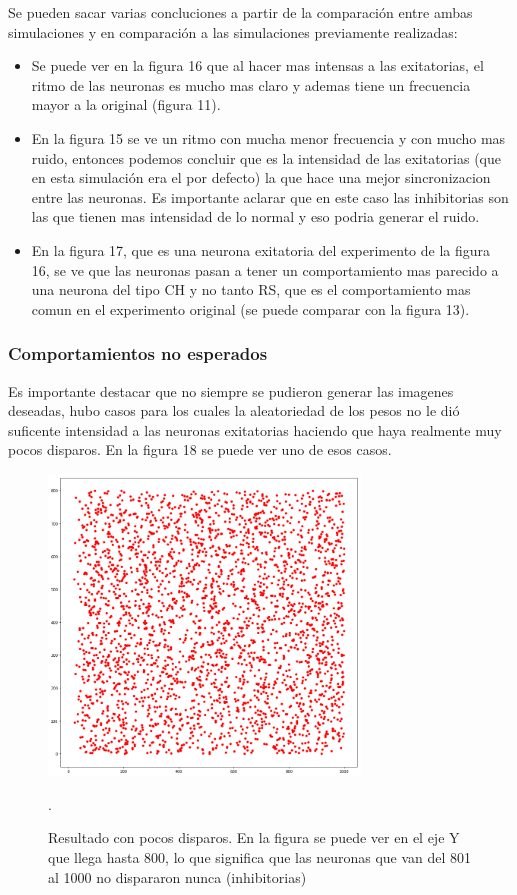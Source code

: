 \documentclass[12pt]{article}
\begin{document}
Se pueden sacar varias concluciones a partir de la comparación entre ambas simulaciones y en comparación a las simulaciones previamente realizadas:
\begin{itemize}
    \item Se puede ver en la figura 16 que al hacer mas intensas a las exitatorias, el ritmo de las neuronas es mucho mas claro y ademas tiene un frecuencia mayor a la original (figura 11).
    \item En la figura 15 se ve un ritmo con mucha menor frecuencia y con mucho mas ruido, entonces podemos concluir que es la intensidad de las exitatorias (que en esta simulación era el por defecto)
    la que hace una mejor sincronizacion entre las neuronas. Es importante aclarar que en este caso las inhibitorias son las que tienen mas intensidad de lo normal y eso podria generar el ruido.
    \item En la figura 17, que es una neurona exitatoria del experimento de la figura 16, se ve que las neuronas pasan a tener un comportamiento mas parecido a una neurona del tipo CH y no tanto RS, que es el comportamiento mas comun en el experimento original (se puede comparar con la figura 13).
\end{itemize}

\subsubsection{Comportamientos no esperados}
Es importante destacar que no siempre se pudieron generar las imagenes deseadas, hubo casos para los cuales la aleatoriedad de los pesos no le dió suficente intensidad a las neuronas exitatorias haciendo que haya realmente muy pocos disparos.
En la figura 18 se puede ver uno de esos casos.

\begin{figure}[htp!]
    \centering
        \includegraphics[height=8cm]{images/resultadoVacio.png}
    \caption[fontsize=2pt]{Resultado con pocos disparos. En la figura se puede ver en el eje Y que llega hasta 800, lo que significa que las neuronas que van del 801 al 1000 no dispararon nunca (inhibitorias)}.
\end{figure}
\end{document}

